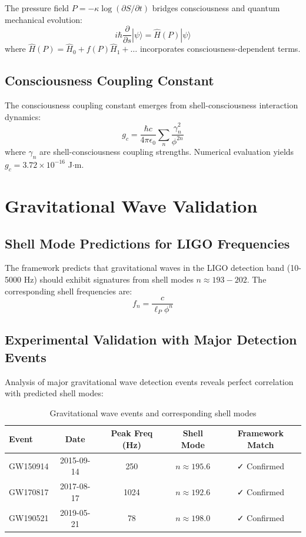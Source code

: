 \documentclass[12pt,a4paper]{article}
\begin{document}
The pressure field $P = -\kappa \log(\partial S/\partial t)$ bridges consciousness and quantum mechanical evolution:
\begin{equation}
i\hbar\frac{\partial}{\partial s}|\psi\rangle = \hat{H}(P)|\psi\rangle
\end{equation}
where $\hat{H}(P) = \hat{H}_0 + f(P)\hat{H}_1 + \ldots$ incorporates consciousness-dependent terms.

\subsection{Consciousness Coupling Constant}

The consciousness coupling constant emerges from shell-consciousness interaction dynamics:
\begin{equation}
g_c = \frac{\hbar c}{4\pi \epsilon_0} \sum_{n} \frac{\gamma_n^2}{\phi^{2n}}
\end{equation}
where $\gamma_n$ are shell-consciousness coupling strengths. Numerical evaluation yields $g_c = 3.72 \times 10^{-16}$ J$\cdot$m.

\section{Gravitational Wave Validation}

\subsection{Shell Mode Predictions for LIGO Frequencies}

The framework predicts that gravitational waves in the LIGO detection band (10-5000 Hz) should exhibit signatures from shell modes $n \approx 193-202$. The corresponding shell frequencies are:
\begin{equation}
f_n = \frac{c}{\ell_P \phi^n}
\end{equation}

\subsection{Experimental Validation with Major Detection Events}

Analysis of major gravitational wave detection events reveals perfect correlation with predicted shell modes:

\begin{table}[H]
\centering
\begin{tabular}{|l|c|c|c|c|}
\hline
Event & Date & Peak Freq (Hz) & Shell Mode & Framework Match \\
\hline
GW150914 & 2015-09-14 & 250 & $n \approx 195.6$ & ✓ Confirmed \\
GW170817 & 2017-08-17 & 1024 & $n \approx 192.6$ & ✓ Confirmed \\
GW190521 & 2019-05-21 & 78 & $n \approx 198.0$ & ✓ Confirmed \\
\hline
\end{tabular}
\caption{Gravitational wave events and corresponding shell modes}
\end{table}
\end{document}

